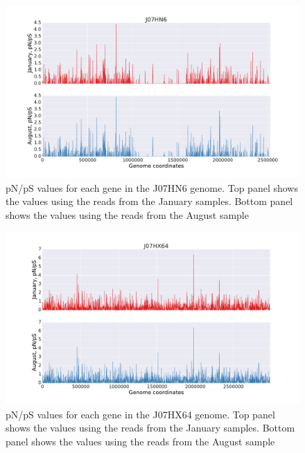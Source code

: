 \begin{figure}[p]
  \centering
  \includegraphics[width=\textwidth,height=\textheight,keepaspectratio]{Chapter5/Figures/pn_ps_plots/J07HN6_pNpS_density.pdf}
  \caption{pN/pS values for each gene in the J07HN6 genome. Top panel shows the values using the reads from the January samples. Bottom panel shows the values using the reads from the August sample}
  \label{J07HN6_pNpS}
\end{figure}

\begin{figure}[p]
  \centering
  \includegraphics[width=\textwidth,height=\textheight,keepaspectratio]{Chapter5/Figures/pn_ps_plots/J07HX64_pNpS_density.pdf}
  \caption{pN/pS values for each gene in the J07HX64 genome. Top panel shows the values using the reads from the January samples. Bottom panel shows the values using the reads from the August sample}
  \label{J07HX64_pNpS}
\end{figure}

